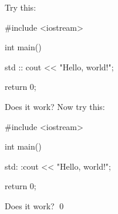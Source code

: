 
Try this:
\begin{console}
#include <iostream>

int main()
{
    std :: cout << "Hello, world!\n";

    return 0;
}
\end{console}
Does it work?
Now try this:
\begin{console}
#include <iostream>

int main()
{
    std:     :cout << "Hello, world!\n";

    return 0;
}
\end{console}
Does it work?
\qed
